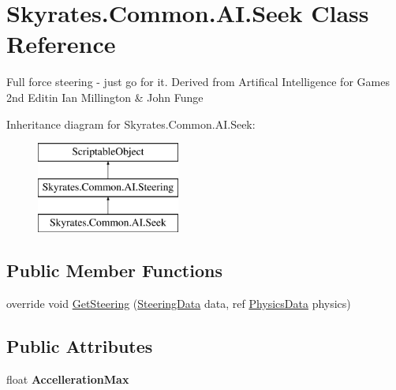 \hypertarget{class_skyrates_1_1_common_1_1_a_i_1_1_seek}{\section{Skyrates.\-Common.\-A\-I.\-Seek Class Reference}
\label{class_skyrates_1_1_common_1_1_a_i_1_1_seek}
}


Full force steering -\/ just go for it. Derived from Artifical Intelligence for Games 2nd Editin Ian Millington \& John Funge  


Inheritance diagram for Skyrates.\-Common.\-A\-I.\-Seek\-:\begin{figure}[H]
\begin{center}
\leavevmode
\includegraphics[height=3.000000cm]{class_skyrates_1_1_common_1_1_a_i_1_1_seek}
\end{center}
\end{figure}
\subsection*{Public Member Functions}
\begin{DoxyCompactItemize}
\item 
override void \hyperlink{class_skyrates_1_1_common_1_1_a_i_1_1_seek_add201f296cfd487d2dff9362c8c501bc}{Get\-Steering} (\hyperlink{class_skyrates_1_1_common_1_1_a_i_1_1_steering_data}{Steering\-Data} data, ref \hyperlink{class_skyrates_1_1_common_1_1_a_i_1_1_physics_data}{Physics\-Data} physics)
\end{DoxyCompactItemize}
\subsection*{Public Attributes}
\begin{DoxyCompactItemize}
\item 
\hypertarget{class_skyrates_1_1_common_1_1_a_i_1_1_seek_a115d898000952d1eedfe33a4b7a33046}{float {\bfseries Accelleration\-Max}}\label{class_skyrates_1_1_common_1_1_a_i_1_1_seek_a115d898000952d1eedfe33a4b7a33046}

\end{DoxyCompactItemize}


